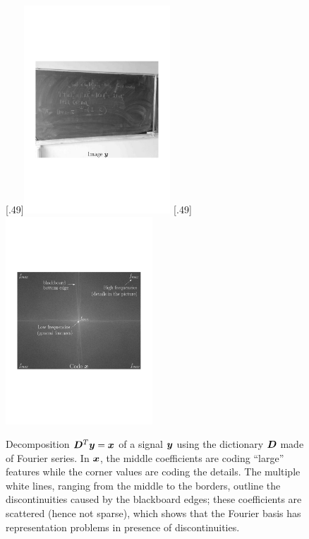 \begin{figure}[!ht]
%
  [.49\linewidth]{\includegraphics[width=0.49\textwidth]{figures/fourier/image.pdf}}
  [.49\linewidth]{\includegraphics[width=0.49\textwidth]{figures/fourier/fourier.pdf}}
  \caption{Decomposition $\bm{D}^T\bm{y}=\bm{x}$ of a signal $\bm{y}$ using the dictionary $\bm{D}$ made of Fourier series. In $\bm{x}$, the middle coefficients are coding “large” features while the corner values are coding the details. The multiple white lines, ranging from the middle to the borders, outline the discontinuities caused by the blackboard edges; these coefficients are scattered (hence not sparse), which shows that the Fourier basis has representation problems in presence of discontinuities.}\label{fig_fourier}
\end{figure}

